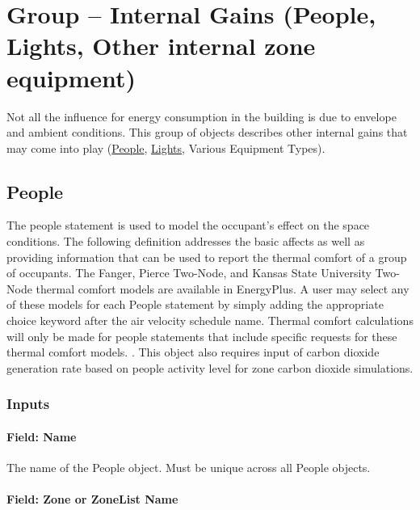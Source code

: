 \section[Group -- Internal Gains]{Group -- Internal Gains (People, Lights, Other internal zone equipment)}\label{group-internal-gains-people-lights-other-internal-zone-equipment}

Not all the influence for energy consumption in the building is due to envelope and ambient conditions. This group of objects describes other internal gains that may come into play (\hyperref[people]{People}, \hyperref[lights-000]{Lights}, Various Equipment Types).

\subsection{People}\label{people}

The people statement is used to model the occupant's effect on the space conditions. The following definition addresses the basic affects as well as providing information that can be used to report the thermal comfort of a group of occupants. The Fanger, Pierce Two-Node, and Kansas State University Two-Node thermal comfort models are available in EnergyPlus. A user may select any of these models for each People statement by simply adding the appropriate choice keyword after the air velocity schedule name. Thermal comfort calculations will only be made for people statements that include specific requests for these thermal comfort models. . This object also requires input of carbon dioxide generation rate based on people activity level for zone carbon dioxide simulations.

\subsubsection{Inputs}\label{inputs-025}

\paragraph{Field: Name}\label{field-name-024}

The name of the People object. Must be unique across all People objects.

\paragraph{Field: Zone or ZoneList Name}\label{field-zone-or-zonelist-name-000}

